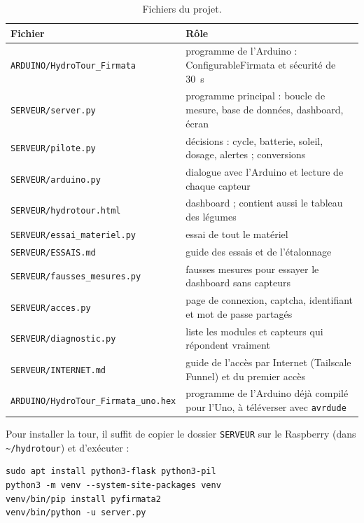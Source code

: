 \begin{table}[H]
\centering
\small
\begin{tabularx}{\textwidth}{|l|Y|}
\hline
\textbf{Fichier} & \textbf{Rôle} \\
\hline
\texttt{ARDUINO/HydroTour\_Firmata} & programme de l'Arduino : ConfigurableFirmata et sécurité de \qty{30}{s} \\
\hline
\texttt{SERVEUR/server.py} & programme principal : boucle de mesure, base de données, dashboard, écran \\
\hline
\texttt{SERVEUR/pilote.py} & décisions : cycle, batterie, soleil, dosage, alertes ; conversions \\
\hline
\texttt{SERVEUR/arduino.py} & dialogue avec l'Arduino et lecture de chaque capteur \\
\hline
\texttt{SERVEUR/hydrotour.html} & dashboard ; contient aussi le tableau des légumes \\
\hline
\texttt{SERVEUR/essai\_materiel.py} & essai de tout le matériel \\
\hline
\texttt{SERVEUR/ESSAIS.md} & guide des essais et de l'étalonnage \\
\hline
\texttt{SERVEUR/fausses\_mesures.py} & fausses mesures pour essayer le dashboard sans capteurs \\
\hline
\texttt{SERVEUR/acces.py} & page de connexion, captcha, identifiant et mot de passe partagés \\
\hline
\texttt{SERVEUR/diagnostic.py} & liste les modules et capteurs qui répondent vraiment \\
\hline
\texttt{SERVEUR/INTERNET.md} & guide de l'accès par Internet (Tailscale Funnel) et du premier accès \\
\hline
\texttt{ARDUINO/HydroTour\_Firmata\_uno.hex} & programme de l'Arduino déjà compilé pour l'Uno, à téléverser avec \texttt{avrdude} \\
\hline
\end{tabularx}
\caption{Fichiers du projet.}
\end{table}

Pour installer la tour, il suffit de copier le dossier \texttt{SERVEUR} sur le Raspberry (dans \texttt{\textasciitilde/hydrotour}) et d'exécuter :

\begin{verbatim}
sudo apt install python3-flask python3-pil
python3 -m venv --system-site-packages venv
venv/bin/pip install pyfirmata2
venv/bin/python -u server.py
\end{verbatim}

